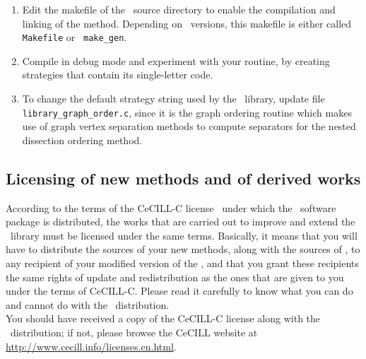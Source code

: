 \begin{enumerate}
\item
Edit the makefile of the \libscotch\ source directory to enable the
compilation and linking of the method. Depending on \libscotch\
versions, this makefile is either called {\tt Makefile} or {\tt
make\_\lbt gen}.
\item
Compile in debug mode and experiment with your routine, by creating
strategies that contain its single-letter code.
\item
To change the default strategy string used by the \libscotch\ library,
update file {\tt library\_\lbt graph\_\lbt order.c}, since it is
the graph ordering routine which makes use of graph vertex separation
methods to compute separators for the nested dissection ordering method.
\end{enumerate}

\subsection{Licensing of new methods and of derived works}

According to the terms of the CeCILL-C license~\cite{cecill} under
which the \scotch\ software package is distributed, the works that are
carried out to improve and extend the \libscotch\ library must be
licensed under the same terms. Basically, it means that you will have
to distribute the sources of your new methods, along with the sources
of \scotch, to any recipient of your modified version of the
\libscotch, and that you grant these recipients the same rights of
update and redistribution as the ones that are given to you under the
terms of CeCILL-C. Please read it carefully to know what you can do
and cannot do with the \scotch\ distribution.
\\

You should have received a copy of the CeCILL-C
license along with the \scotch\ distribution; if not, please
browse the CeCILL website at
\url{http://www.cecill.info/licenses.en.html}.

